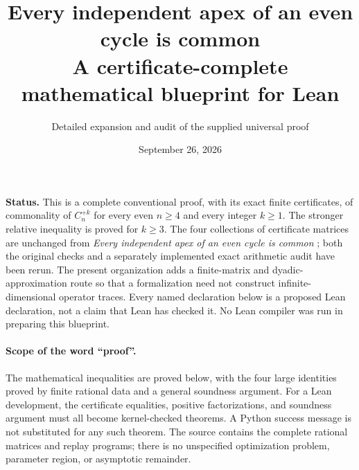 \usepackage[margin=25mm]{geometry}
\usepackage[T1]{fontenc}
\usepackage{lmodern,microtype}
\usepackage[hidelinks]{hyperref}
\usepackage{fancyhdr}
\pagestyle{fancy}\fancyhf{}
\cfoot{\thepage}
\setlength{\headheight}{14pt}
\setlength{\emergencystretch}{3em}
\providecommand{\lean}[1]{\leavevmode\par\nobreak\smallskip\noindent{\normalfont\scriptsize\textsf{Proposed declaration: }\texttt{\detokenize{#1}}}\par\nobreak\smallskip}
\providecommand{\uses}[1]{}
\providecommand{\proves}[1]{}

\title{Every independent apex of an even cycle is common\\[5pt]
\large A certificate-complete mathematical blueprint for Lean}
\author{Detailed expansion and audit of the supplied universal proof}
\date{September 26, 2026}

\maketitle
\noindent\textbf{Status.}
This is a complete conventional proof, with its exact finite certificates, of commonality of
$C_n^{+k}$ for every even $n\ge4$ and every integer $k\ge1$.  The stronger relative inequality
is proved for $k\ge3$.  The four collections of certificate matrices are unchanged from
\emph{Every independent apex of an even cycle is common} \cite{universal}; both the original
checks and a separately implemented exact arithmetic audit have been rerun.  The present
organization adds a finite-matrix and dyadic-approximation route so that a formalization
need not construct infinite-dimensional operator traces.  Every named declaration below is
a proposed Lean declaration, not a claim that Lean has checked it.  No Lean compiler was
run in preparing this blueprint.

\paragraph{Scope of the word ``proof''.}
The mathematical inequalities are proved below, with the four large identities proved by
finite rational data and a general soundness argument.  For a Lean development, the
certificate equalities, positive factorizations, and soundness argument must all become
kernel-checked theorems.  A Python success message is not substituted for any such theorem.
The source contains the complete rational matrices and replay programs; there is no
unspecified optimization problem, parameter region, or asymptotic remainder.

